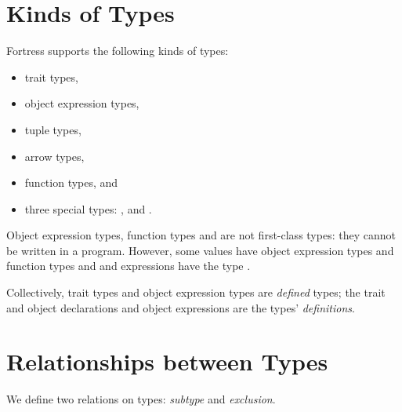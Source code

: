 \section{Kinds of Types}

Fortress supports the following kinds of types:
\begin{itemize}

\item
trait types,

\item
object expression types,

\item
tuple types,

\item
arrow types,

\item
function types, and

\item
three special types:
,  and \TYP{()}.

\end{itemize}

Object expression types, function types and 
are not first-class types: they cannot be written in a program.
However, some values have object expression types and function types
and  and  expressions have the type .

Collectively,
trait types and object expression types are \emph{defined} types;
the trait and object declarations and object expressions
are the types' \emph{definitions}.


\section{Relationships between Types}

We define two relations on types: \emph{subtype} and \emph{exclusion}.

